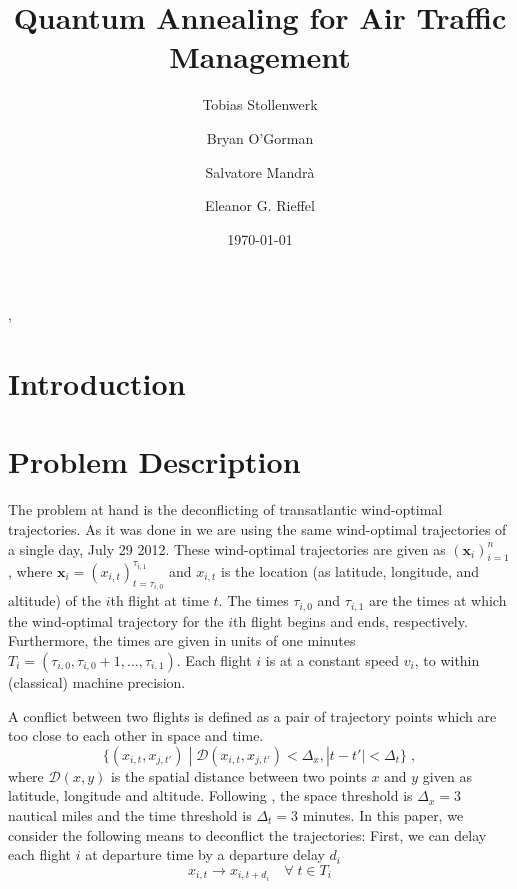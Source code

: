 \documentclass[aps,pra,twocolumn,10pt]{revtex4-1}
\begin{document}
\title{Quantum Annealing for Air Traffic Management}
\author{Tobias Stollenwerk}
\author{Bryan O'Gorman},
\author{Salvatore Mandr\`{a}}
\author{Eleanor G. Rieffel}
\date{\today}

\maketitle


\section{Introduction}


\section{Problem Description}
The problem at hand is the deconflicting of transatlantic wind-optimal trajectories.
As it was done in \cite{rodionova16} we are using the same wind-optimal trajectories of a single day, July 29 2012.
These wind-optimal trajectories are given as
${\left(\mathbf{x}_i\right)}_{i=1}^n$, 
where 
$\mathbf{x}_i = {\left(x_{i,t}\right)}_{t=\tau_{i,0}}^{\tau_{i,1}}$ 
and 
$x_{i, t}$ is the location (as latitude, longitude, and altitude) of the $i$th flight at time $t$.
The times $\tau_{i,0}$ and $\tau_{i, 1}$ are the times at which the wind-optimal trajectory for the $i$th flight begins and ends, respectively.
Furthermore, the times are given in units of one minutes $T_i = \left(\tau_{i, 0}, \tau_{i, 0} + 1, \ldots, \tau_{i, 1}\right)$.
Each flight $i$ is at a constant speed $v_i$, to within (classical) machine precision.

A conflict between two flights is defined as a pair of trajectory points which are too close to each other in space and time.
\begin{equation*}
    \{ (x_{i, t},  x_{j, t'}) \; | \; \mathcal{D} (x_{i, t}, x_{j, t'}) < \Delta_x ,  |t - t'| < \Delta_t \} \; ,
\end{equation*}
where $\mathcal{D}(x, y)$ is the spatial distance between two points $x$ and $y$ given as latitude, longitude and altitude.
Following \cite{rodionova16}, the space threshold is $\Delta_x = 3$ nautical miles and the time threshold is $\Delta_t = 3$ minutes.
In this paper, we consider the following means to deconflict the trajectories:
First, we can delay each flight $i$ at departure time by a departure delay $d_i$
\begin{equation*}
    x_{i, t} \to x_{i, t + d_i} \quad \forall \; t \in T_{i}
\end{equation*}
\end{document}
